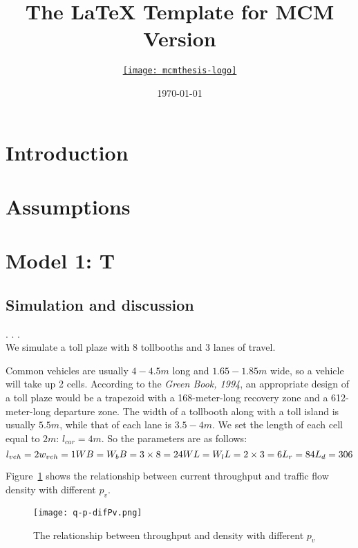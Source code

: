 \documentclass{mcmthesis}
\title{The \LaTeX{} Template for MCM Version \MCMversion}
\author{\small \href{http://www.latexstudio.net/}
  {\texttt{[image: mcmthesis-logo]}}}
\date{\today}
\begin{document}
\section{Introduction}
\section{Assumptions}
\section{Model 1: T}
\subsection{Simulation and discussion}
.
.
.
\\
We simulate a toll plaze with 8 tollbooths and 3 lanes of travel.

Common vehicles are usually $4-4.5m$ long and $1.65-1.85m$ wide,
so a vehicle will take up 2 cells.
According to the \emph{Green Book, 1994}, an appropriate design of
a toll plaze would be a trapezoid with a
168-meter-long recovery zone and a 612-meter-long departure zone.
The width of a tollbooth along with a toll island
is usually $5.5m$, while that of each lane is $3.5-4m$.
We set the length of each cell equal to $2m$: $l_{car}=4m$.
So the parameters are as follows:
\[
{l}_{veh}=2\\
{w}_{veh}=1\\
WB={W}_{b}B=3\times8=24\\
WL={W}_{l}L=2\times3=6\\
{L}_{r}=84\\
{L}_{d}=306\\
\]

Figure~\ref{fig:q-p} shows the relationship between current throughput and
traffic flow density with different ${p}_{v}$.


\begin{figure}[h]
\small
\centering
\texttt{[image: q-p-difPv.png]}
\caption{The relationship between throughput and density with different ${p}_{v}$}
\label{fig:q-p}

\end{figure}
\end{document}

